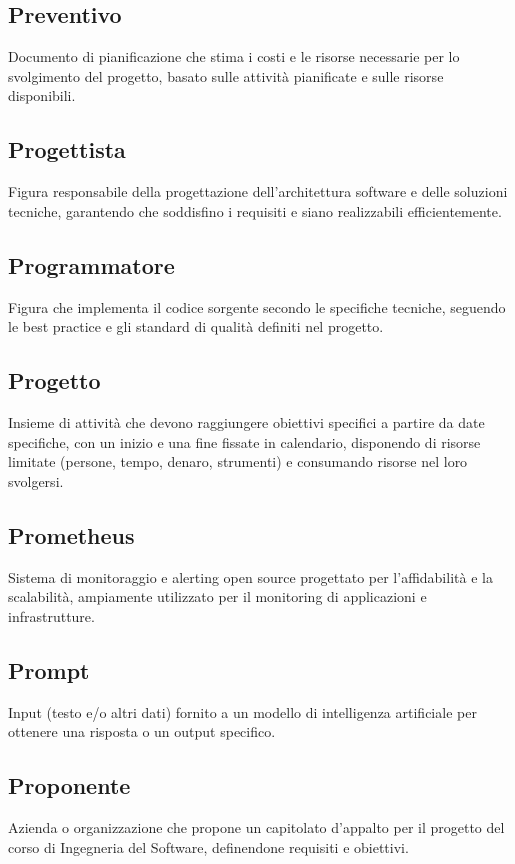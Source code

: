 \documentclass[a4paper,11pt]{article}
\begin{document}
\subsection{Preventivo}
Documento di pianificazione che stima i costi e le risorse necessarie per lo svolgimento del progetto, basato sulle attività pianificate e sulle risorse disponibili.

\subsection{Progettista}
Figura responsabile della progettazione dell'architettura software e delle soluzioni tecniche, garantendo che soddisfino i requisiti e siano realizzabili efficientemente.

\subsection{Programmatore}
Figura che implementa il codice sorgente secondo le specifiche tecniche, seguendo le best practice e gli standard di qualità definiti nel progetto.

\subsection{Progetto}
Insieme di attività che devono raggiungere obiettivi specifici a partire da date specifiche, con un inizio e una fine fissate in calendario, disponendo di risorse limitate (persone, tempo, denaro, strumenti) e consumando risorse nel loro svolgersi.

\subsection{Prometheus}
Sistema di monitoraggio e alerting open source progettato per l'affidabilità e la scalabilità, ampiamente utilizzato per il monitoring di applicazioni e infrastrutture.

\subsection{Prompt}
Input (testo e/o altri dati) fornito a un modello di intelligenza artificiale per ottenere una risposta o un output specifico.

\subsection{Proponente}
Azienda o organizzazione che propone un capitolato d'appalto per il progetto del corso di Ingegneria del Software, definendone requisiti e obiettivi.
\end{document}
